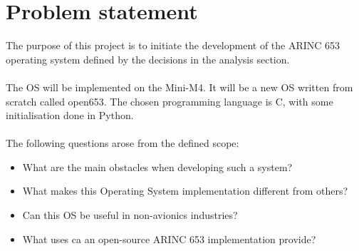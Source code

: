 \chapter{Problem statement}


The purpose of this project is to initiate 
the development of the ARINC 653 operating 
system defined by the decisions in the analysis section.
\\\\
The OS will be implemented on the Mini-M4.
It will be a new OS written from scratch 
called open653. The chosen programming 
language is C, with some initialisation 
done in Python.
\\\\
The following questions arose from the defined scope:
\begin{itemize}
 \item What are the main obstacles when developing such a system?
 \item What makes this Operating System implementation different from others?
 \item Can this OS be useful in non-avionics industries?
 \item What uses ca an open-source ARINC 653 implementation provide?
\end{itemize}